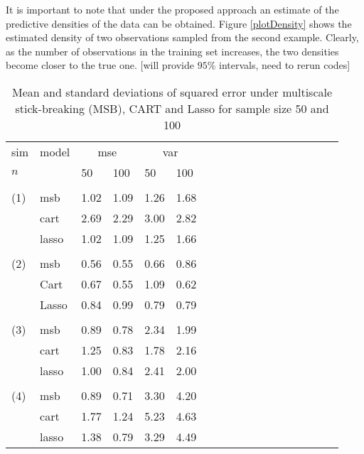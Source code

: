 \documentclass{article}
\begin{document}
It is important to note that under the proposed approach an estimate of the predictive densities of the data can be obtained. Figure \ref{plotDensity} shows the estimated density of two observations sampled from the second example. Clearly, as the number of observations in the training set increases, the two densities become closer to the true one. [will provide $95\%$ intervals, need to rerun codes] 
	

\begin{table}[t]
\caption{Mean and standard deviations of squared error under multiscale stick-breaking (MSB), CART and Lasso for sample size 50 and 100}
\label{table1} \vskip 0.15in \begin{center} \begin{small} \begin{sc}
\begin{tabular}{llllllllllllllllll}
\hline
\abovespace\belowspace
 sim &model& \multicolumn{2}{c}{mse}& \multicolumn{2}{c}{var}\\
 $n$&& 50 &100 &50 &100\\
\hline
\\
(1)&msb&   1.02 &  1.09 &1.26  &  1.68\\
&cart&  2.69&  2.29& 3.00 &    2.82\\
&lasso &  1.02 &   1.09 &  1.25&   1.66\\
\\
(2)&msb&0.56&0.55& 0.66&0.86\\ %
&Cart& 0.67&0.55& 1.09&0.62\\
&Lasso& 0.84&0.99& 0.79&0.79\\

\\
(3)&msb&    0.89 &  0.78 &2.34  &  1.99\\
&cart&  1.25 &  0.83& 1.78 &    2.16\\
&lasso &   1.00 &   0.84 &    2.41&   2.00\\
\\
(4)
&msb& 0.89&0.71&3.30&4.20\\
&cart & 1.77 &1.24& 5.23&4.63\\
&lasso & 1.38 &0.79&3.29&4.49\\
\hline

\end{tabular}
\end{sc}
\end{small}
\end{center}
\vskip -0.1in
\end{table}
\end{document}
